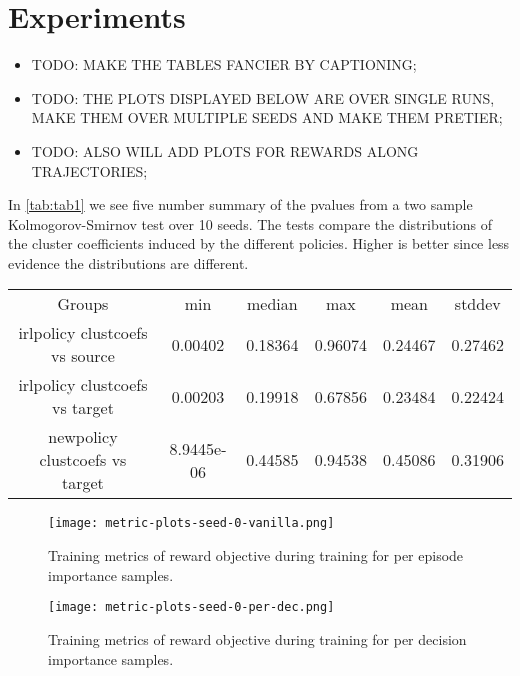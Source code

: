 \documentclass{report}
\numberwithin{equation}{section}
\numberwithin{figure}{section}
\numberwithin{table}{section}
\numberwithin{algorithm}{section}
\begin{document}
\chapter{Experiments}\label{chap:experiments}

\begin{itemize}
  \item TODO: MAKE THE TABLES FANCIER BY CAPTIONING;
  \item TODO: THE PLOTS DISPLAYED BELOW ARE OVER SINGLE RUNS, 
  MAKE THEM OVER MULTIPLE SEEDS AND MAKE THEM PRETIER;
  \item TODO: ALSO WILL ADD PLOTS FOR REWARDS ALONG TRAJECTORIES;
\end{itemize}

In \ref{tab:tab1} we see five number summary of the pvalues 
from a two sample Kolmogorov-Smirnov test over 10 seeds.
The tests compare the distributions of the cluster coefficients 
induced by the different policies. Higher is better since 
less evidence the distributions are different.
\begin{center}\label{tab:tab1}  
  \begin{tabular}{|c|c|c|c|c|c|}
    \hline
    Groups & min & median & max & mean & stddev\\
    irlpolicy clustcoefs vs source  & 0.00402 & 0.18364 & 0.96074 &  0.24467 & 0.27462\\
    irlpolicy clustcoefs vs target  & 0.00203 & 0.19918 & 0.67856 & 0.23484 & 0.22424\\
    newpolicy clustcoefs vs target & 8.9445e-06 & 0.44585 & 0.94538 & 0.45086 & 0.31906\\
    \hline
  \end{tabular}
  
\end{center}

\begin{figure}
  \texttt{[image: metric-plots-seed-0-vanilla.png]}
  \caption{Training metrics of reward objective during training for 
  per episode importance samples.}
\end{figure}

\begin{figure}
  \texttt{[image: metric-plots-seed-0-per-dec.png]}
  \caption{Training metrics of reward objective during training for 
  per decision importance samples.}
\end{figure}
\end{document}
